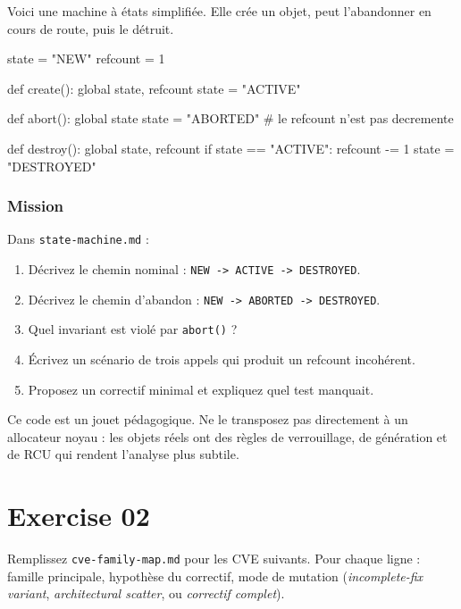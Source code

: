 \documentclass{training}
\begin{document}
Voici une machine à états simplifiée. Elle crée un objet, peut l'abandonner
en cours de route, puis le détruit.

\begin{console}
state = "NEW"
refcount = 1

def create():
    global state, refcount
    state = "ACTIVE"

def abort():
    global state
    state = "ABORTED"
    # le refcount n'est pas decremente

def destroy():
    global state, refcount
    if state == "ACTIVE":
        refcount -= 1
    state = "DESTROYED"
\end{console}

\subsection*{Mission}

Dans \texttt{state-machine.md} :

\begin{enumerate}
  \item Décrivez le chemin nominal : \texttt{NEW -> ACTIVE -> DESTROYED}.
  \item Décrivez le chemin d'abandon : \texttt{NEW -> ABORTED -> DESTROYED}.
  \item Quel invariant est violé par \texttt{abort()} ?
  \item Écrivez un scénario de trois appels qui produit un refcount
        incohérent.
  \item Proposez un correctif minimal et expliquez quel test manquait.
\end{enumerate}

\begin{warn}
Ce code est un jouet pédagogique. Ne le transposez pas directement à un
allocateur noyau : les objets réels ont des règles de verrouillage, de
génération et de RCU qui rendent l'analyse plus subtile.
\end{warn}

\chapter{Exercise 02}
\makeheaderfiles

Remplissez \texttt{cve-family-map.md} pour les CVE suivants. Pour chaque
ligne : famille principale, hypothèse du correctif, mode de mutation
(\emph{incomplete-fix variant}, \emph{architectural scatter}, ou
\emph{correctif complet}).
\end{document}
